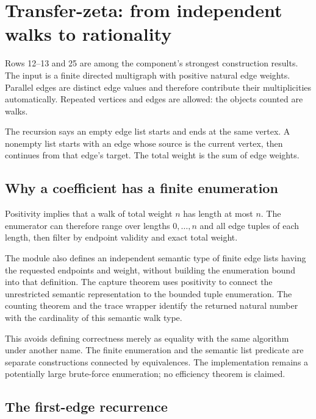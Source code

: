 \section{Transfer-zeta: from independent walks to rationality}\label{sec:zeta}

Rows 12--13 and 25 are among the component's strongest construction results. The input is a finite directed multigraph with positive natural edge weights. Parallel edges are distinct edge values and therefore contribute their multiplicities automatically. Repeated vertices and edges are allowed: the objects counted are walks.

The recursion  says an empty edge list starts and ends at the same vertex. A nonempty list starts with an edge whose source is the current vertex, then continues from that edge's target. The total weight is the sum of edge weights.

\subsection{Why a coefficient has a finite enumeration}

Positivity implies that a walk of total weight $n$ has length at most $n$. The enumerator can therefore range over lengths $0,\ldots,n$ and all edge tuples of each length, then filter by endpoint validity and exact total weight.

The module also defines an independent semantic type of finite edge lists having the requested endpoints and weight, without building the enumeration bound into that definition. The capture theorem uses positivity to connect the unrestricted semantic representation to the bounded tuple enumeration. The counting theorem and the trace wrapper identify the returned natural number with the cardinality of this semantic walk type.

This avoids defining correctness merely as equality with the same algorithm under another name. The finite enumeration and the semantic list predicate are separate constructions connected by equivalences. The implementation remains a potentially large brute-force enumeration; no efficiency theorem is claimed.

\subsection{The first-edge recurrence}

